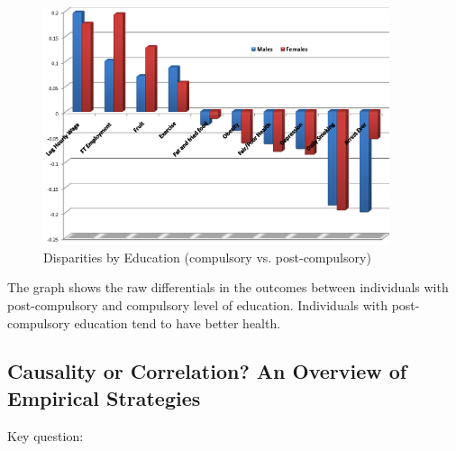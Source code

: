         \begin{figure}[H]
            \centering
            \includegraphics[width=4in]{images/ch3/34.png}
            \caption{Disparities by Education (compulsory vs. post-compulsory)}
        \end{figure}    
         The graph shows the raw differentials in the outcomes between individuals with post-compulsory and compulsory level of education.          Individuals with post-compulsory education tend to have better health.

    \subsection{Causality or Correlation? An Overview of Empirical Strategies}
    
        Key question: 
        
